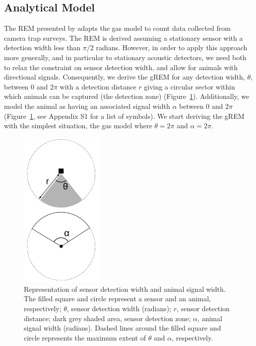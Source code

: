 \documentclass[a4paper,10pt,reqno,oneside]{amsart}
\begin{document}
\subsection*{Analytical Model}

The REM presented by \citet{rowcliffe2008estimating} adapts the gas model to count data collected from camera trap surveys. The REM is derived assuming a stationary sensor with a detection width less than $\pi/2$ radians. However, in order to apply this approach more generally, and in particular to stationary acoustic detectors, we need both to relax the constraint on sensor detection width, and allow for animals with directional signals. Consequently, we derive the gREM for any detection width, $ \theta$, between 0 and $2\pi$ with a detection distance $r$ giving a circular sector within which animals can be captured (the detection zone) (Figure~\ref{f:AngleDef}). Additionally, we model the animal as having an associated signal width $\alpha$ between 0 and $2\pi$  (Figure~\ref{f:AngleDef}, see Appendix S1 for a list of symbols). We start deriving the gREM with the simplest situation, the gas model where $\theta =  2\pi$ and $ \alpha =  2\pi$. 


\begin{figure}[t]
        \centering
	\includegraphics[width=4cm]{imgs/angleDefinitions.pdf}

\caption{Representation of sensor detection width and animal signal width. The filled square and circle represent a sensor and an animal, respectively; $\theta$, sensor detection width (radians); $r$, sensor detection distance; dark grey shaded area, sensor detection zone; $\alpha$, animal signal width (radians). Dashed lines around the filled square and circle represents the maximum extent of $\theta$ and $\alpha$, respectively.} 
\label{f:AngleDef}
\end{figure}
\end{document}

